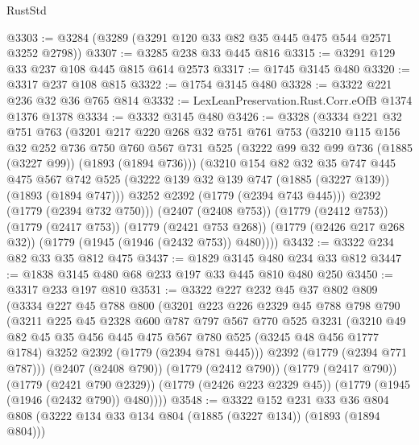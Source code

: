 \begin{lexlean}{RustStd}
\begin{coremodule}
@3303 := @3284 (@3289 (@3291 @120 @33 @82 @35 @445 @475 @544 @2571 @3252 @2798))
@3307 := @3285 @238 @33 @445 @816
@3315 := @3291 @129 @33 @237 @108 @445 @815 @614 @2573
@3317 := @1745 @3145 @480
@3320 := @3317 @237 @108 @815
@3322 := @1754 @3145 @480
@3328 := @3322 @221 @236 @32 @36 @765 @814
@3332 := LexLeanPreservation.Rust.Corr.eOfB @1374 @1376 @1378
@3334 := @3332 @3145 @480
@3426 := @3328
    (@3334
      @221
      @32
      @751
      @763
      (@3201
        @217
        @220
        @268
        @32
        @751
        @761
        @753
        (@3210
          @115
          @156
          @32
          @252
          @736
          @750
          @760
          @567
          @731
          @525
          (@3222 @99 @32 @99 @736 (@1885 (@3227 @99)) (@1893 (@1894 @736)))
          (@3210
            @154
            @82
            @32
            @35
            @747
            @445
            @475
            @567
            @742
            @525
            (@3222 @139 @32 @139 @747 (@1885 (@3227 @139)) (@1893 (@1894 @747)))
            @3252
            @2392
            (@1779 (@2394 @743 @445)))
          @2392
          (@1779 (@2394 @732 @750)))
        (@2407 (@2408 @753))
        (@1779 (@2412 @753))
        (@1779 (@2417 @753))
        (@1779 (@2421 @753 @268))
        (@1779 (@2426 @217 @268 @32))
        (@1779 (@1945 (@1946 (@2432 @753)) @480))))
@3432 := @3322 @234 @82 @33 @35 @812 @475
@3437 := @1829 @3145 @480 @234 @33 @812
@3447 := @1838 @3145 @480 @68 @233 @197 @33 @445 @810 @480 @250
@3450 := @3317 @233 @197 @810
@3531 := @3322
    @227
    @232
    @45
    @37
    @802
    @809
    (@3334
      @227
      @45
      @788
      @800
      (@3201
        @223
        @226
        @2329
        @45
        @788
        @798
        @790
        (@3211
          @225
          @45
          @2328
          @600
          @787
          @797
          @567
          @770
          @525
          @3231
          (@3210
            @49
            @82
            @45
            @35
            @456
            @445
            @475
            @567
            @780
            @525
            (@3245 @48 @456 @1777 @1784)
            @3252
            @2392
            (@1779 (@2394 @781 @445)))
          @2392
          (@1779 (@2394 @771 @787)))
        (@2407 (@2408 @790))
        (@1779 (@2412 @790))
        (@1779 (@2417 @790))
        (@1779 (@2421 @790 @2329))
        (@1779 (@2426 @223 @2329 @45))
        (@1779 (@1945 (@1946 (@2432 @790)) @480))))
@3548 := @3322
    @152
    @231
    @33
    @36
    @804
    @808
    (@3222 @134 @33 @134 @804 (@1885 (@3227 @134)) (@1893 (@1894 @804)))

\end{coremodule}
\end{lexlean}
